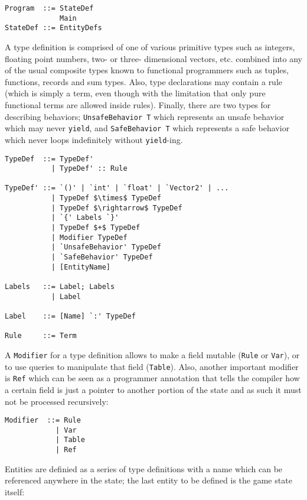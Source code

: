 \begin{lstlisting}
Program  ::= StateDef
             Main
StateDef ::= EntityDefs
\end{lstlisting}

A type definition is comprised of one of various primitive types such as integers, floating point numbers, two- or three- dimensional vectors, etc. combined into any of the usual composite types known to functional programmers such as tuples, functions, records and sum types. Also, type declarations may contain a rule (which is simply a term, even though with the limitation that only pure functional terms are allowed inside rules). Finally, there are two types for describing behaviors; \texttt{UnsafeBehavior T} which represents an unsafe behavior which may never \texttt{yield}, and \texttt{SafeBehavior T} which represents a safe behavior which never loops indefinitely without \texttt{yield}-ing.

\begin{lstlisting}
TypeDef  ::= TypeDef'
           | TypeDef' :: Rule
          
TypeDef' ::= `()' | `int' | `float' | `Vector2' | ...
           | TypeDef $\times$ TypeDef
           | TypeDef $\rightarrow$ TypeDef
           | `{' Labels `}'
           | TypeDef $+$ TypeDef
           | Modifier TypeDef
           | `UnsafeBehavior' TypeDef
           | `SafeBehavior' TypeDef
           | [EntityName]
           
Labels   ::= Label; Labels
           | Label
           
Label    ::= [Name] `:' TypeDef
                     
Rule     ::= Term
\end{lstlisting}

A \texttt{Modifier} for a type definition allows to make a field mutable (\texttt{Rule} or \texttt{Var}), or to use queries to manipulate that field (\texttt{Table}). Also, another important modifier is \texttt{Ref} which can be seen as a programmer annotation that tells the compiler how a certain field is just a pointer to another portion of the state and as such it must not be processed recursively:

\begin{lstlisting}
Modifier  ::= Rule
            | Var
            | Table
            | Ref
\end{lstlisting}

Entities are definied as a series of type definitions with a name which can be referenced anywhere in the state; the last entity to be defined is the game state itself:

